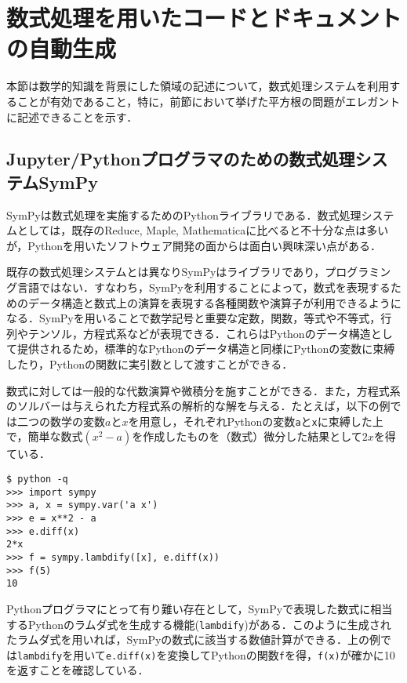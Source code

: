 \section {数式処理を用いたコードとドキュメントの自動生成}
\label {sec: solution}

本節は数学的知識を背景にした領域の記述について，数式処理システムを利用することが有効であること，特に，前節において挙げた平方根の問題がエレガントに記述できることを示す．

\subsection {Jupyter/Pythonプログラマのための数式処理システムSymPy}

SymPyは数式処理を実施するためのPythonライブラリである．数式処理システムとしては，既存のReduce, Maple, Mathematicaに比べると不十分な点は多いが，Pythonを用いたソフトウェア開発の面からは面白い興味深い点がある．

既存の数式処理システムとは異なりSymPyはライブラリであり，プログラミング言語ではない．すなわち，SymPyを利用することによって，数式を表現するためのデータ構造と数式上の演算を表現する各種関数や演算子が利用できるようになる．SymPyを用いることで数学記号と重要な定数，関数，等式や不等式，行列やテンソル，方程式系などが表現できる．これらはPythonのデータ構造として提供されるため，標準的なPythonのデータ構造と同様にPythonの変数に束縛したり，Pythonの関数に実引数として渡すことができる．

数式に対しては一般的な代数演算や微積分を施すことができる．また，方程式系のソルバーは与えられた方程式系の解析的な解を与える．たとえば，以下の例では二つの数学の変数$a$と$x$を用意し，それぞれPythonの変数\verb|a|と\verb|x|に束縛した上で，簡単な数式$(x^2 - a)$を作成したものを（数式）微分した結果として$2x$を得ている．

\bgroup \color {darkred}
\begin{verbatim}
$ python -q
>>> import sympy
>>> a, x = sympy.var('a x')
>>> e = x**2 - a
>>> e.diff(x)
2*x
>>> f = sympy.lambdify([x], e.diff(x))
>>> f(5)
10
\end{verbatim}
\egroup


Pythonプログラマにとって有り難い存在として，SymPyで表現した数式に相当するPythonのラムダ式を生成する機能(\verb|lambdify|)がある．このように生成されたラムダ式を用いれば，SymPyの数式に該当する数値計算ができる．上の例では\verb|lambdify|を用いて\verb|e.diff(x)|を変換してPythonの関数\verb|f|を得，\verb|f(x)|が確かに10を返すことを確認している．

